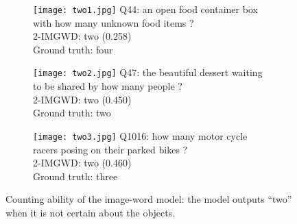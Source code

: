 \begin{figure}\footnotesize
\begin{subfigure}[t]{0.3\textwidth}
    \texttt{[image: two1.jpg]}
    Q44: an open food container box with how many unknown food items ?\\
    2-IMGWD: two (0.258)\\
    Ground truth: four
\end{subfigure}
\quad
\begin{subfigure}[t]{0.3\textwidth}
    \texttt{[image: two2.jpg]}
    Q47: the beautiful dessert waiting to be shared by how many people ?\\
    2-IMGWD: two (0.450)\\
    Ground truth: two
\end{subfigure}
\quad
\begin{subfigure}[t]{0.3\textwidth}
    \texttt{[image: two3.jpg]}
    Q1016: how many motor cycle racers posing on their parked bikes ?\\
    2-IMGWD: two (0.460)\\
    Ground truth: three
\end{subfigure}

\caption{Counting ability of the image-word model: the model outputs ``two'' when it is not certain about the objects.}
\end{figure}

